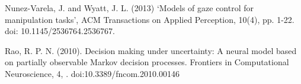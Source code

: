 \documentclass[11]{article}
\begin{document}
\pagebreak

\begin{thebibliography}{9}
Nunez-Varela, J. and Wyatt, J. L. (2013) ‘Models of gaze control for manipulation tasks’, ACM Transactions on Applied Perception, 10(4), pp. 1-22. doi: 10.1145/2536764.2536767.

Rao, R. P. N. (2010). Decision making under uncertainty: A neural model based on partially observable Markov decision processes. Frontiers in Computational Neuroscience, 4, . doi:10.3389/fncom.2010.00146

\end{thebibliography}
\end{document}
